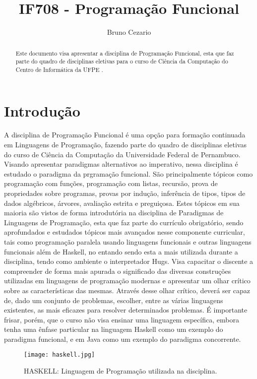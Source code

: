 \documentclass[10pt,twoside,a4paper]{article}
\title{IF708 - Programação Funcional}
\author{Bruno Cezario}
\begin{document}
\maketitle 

\begin{abstract}
Este documento visa apresentar a disciplina de Programação Funcional, esta que faz parte do quadro de disciplinas eletivas para o curso de Ciência da Computação do Centro de Informática da UFPE .
\end{abstract}

\section{Introdução}

A disciplina de Programação Funcional é uma opção para formação continuada em Linguagens de Programação, fazendo parte do quadro de disciplinas eletivas do curso de Ciência da Computação da Universidade Federal de Pernambuco. Visando apresentar paradigmas alternativos ao imperativo, nessa disciplina é estudado o paradigma da prgramação funcional. São principalmente tópicos como programação com funções, programação com listas, recursão, prova de propriedades sobre programas, provas por indução, inferência de tipos, tipos de dados algébricos, árvores, avaliação estrita e preguiçosa. Estes tópicos em sua maioria são vistos de forma introdutória na disciplina de Paradigmas de Linguagens de Programação, esta que faz parte do currículo obrigatório, sendo aprofundados e estudados tópicos mais avançados nesse componente curricular, tais como programação paralela usando linguagens funcionais e outras linguagens funcionais além de Haskell, no entando sendo esta a mais utilizada durante a disciplina, tendo como ambiente o interpretador Hugs. Visa capacitar o discente a compreender de forma mais apurada o significado das diversas construções utilizadas em linguagens de programação modernas e apresentar um olhar crítico sobre as características das mesmas. Através desse olhar crítico, deverá ser capaz de, dado um conjunto de problemas, escolher, entre as várias linguagens existentes, as mais eficazes para resolver determinados problemas. É importante frisar, porém, que o curso não visa ensinar uma linguagem específica, embora tenha uma ênfase particular na linguagem Haskell como um exemplo do paradigma funcional, e em Java como um exemplo do paradigma concorrente.


\begin{figure} [H]
\centering
\texttt{[image: haskell.jpg]}
\caption{\label{fig:haskell}HASKELL: Linguagem de Programação utilizada na disciplina.}
\end{figure}
\end{document}
